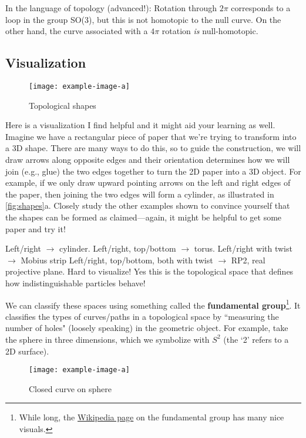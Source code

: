 \documentclass[12pt, english]{book}
\begin{document}
In the language of topology (advanced!): Rotation through $2\pi$ corresponds to a loop in the group SO(3), but this is not homotopic to the null curve.
On the other hand, the curve associated with a $4\pi$ rotation \emph{is} null-homotopic.

\subsection{Visualization}

\begin{figure}[!ht]
	\centering 
	\texttt{[image: example-image-a]}
	\caption{Topological shapes}
	\label{fig:shapes}
\end{figure}

Here is a visualization I find helpful and it might aid your learning as well.
Imagine we have a rectangular piece of paper that we're trying to transform into a 3D shape.
There are many ways to do this, so to guide the construction, we will draw arrows along opposite edges and their orientation determines how we will join (e.g., glue) the two edges together to turn the 2D paper into a 3D object.
For example, if we only draw upward pointing arrows on the left and right edges of the paper, then joining the two edges will form a cylinder, as illustrated in \autoref{fig:shapes}a.
Closely study the other examples shown to convince yourself that the shapes can be formed as claimed---again, it might be helpful to get some paper and try it!

Left/right $\rightarrow$ cylinder.
Left/right, top/bottom $\rightarrow$ torus.
Left/right with twist $\rightarrow$ Mobius strip
Left/right, top/bottom, both with twist $\rightarrow$ RP2, real projective plane.
Hard to visualize!
Yes this is the topological space that defines how indistinguishable particles behave!

We can classify these spaces using something called the \textbf{fundamental group}\footnote{While long, the \href{https://en.wikipedia.org/wiki/Fundamental_group}{Wikipedia page} on the fundamental group has many nice visuals.}. 
It classifies the types of curves/paths in a topological space by ``measuring the number of holes" (loosely speaking) in the geometric object.
For example, take the sphere in three dimensions, which we symbolize with $S^2$ (the `2' refers to a 2D surface).

\begin{figure}[!ht]
	\centering 
	\texttt{[image: example-image-a]}
	\caption{Closed curve on sphere}
	\label{fig:sphere1}
\end{figure}
\end{document}
